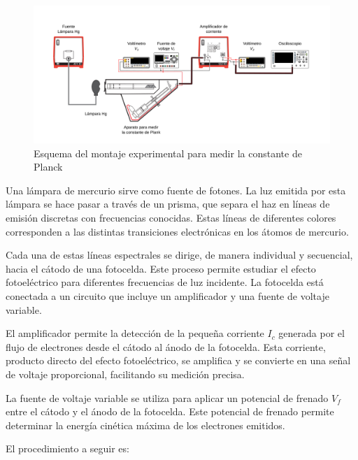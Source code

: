 \documentclass[twocolumn,a4paper,11pt]{scrartcl}
\begin{document}
\begin{figure}[h]
    \centering
    \includegraphics[width=0.8\linewidth]{montaje_experimental_const_planck.png}
    \caption{Esquema del montaje experimental para medir la constante de Planck}
    \label{fig:montaje}
\end{figure}

Una lámpara de mercurio sirve como fuente de fotones. La luz emitida por esta lámpara se hace pasar a través de un prisma, que separa el haz en líneas de emisión discretas con frecuencias conocidas. Estas líneas de diferentes colores corresponden a las distintas transiciones electrónicas en los átomos de mercurio.

Cada una de estas líneas espectrales se dirige, de manera individual y secuencial, hacia el cátodo de una fotocelda. Este proceso permite estudiar el efecto fotoeléctrico para diferentes frecuencias de luz incidente. La fotocelda está conectada a un circuito que incluye un amplificador y una fuente de voltaje variable.

El amplificador permite la detección de la pequeña corriente $I_c$ generada por el flujo de electrones desde el cátodo al ánodo de la fotocelda. Esta corriente, producto directo del efecto fotoeléctrico, se amplifica y se convierte en una señal de voltaje proporcional, facilitando su medición precisa.

La fuente de voltaje variable se utiliza para aplicar un potencial de frenado $V_f$ entre el cátodo y el ánodo de la fotocelda. Este potencial de frenado permite determinar la energía cinética máxima de los electrones emitidos.

El procedimiento a seguir es:
\end{document}
